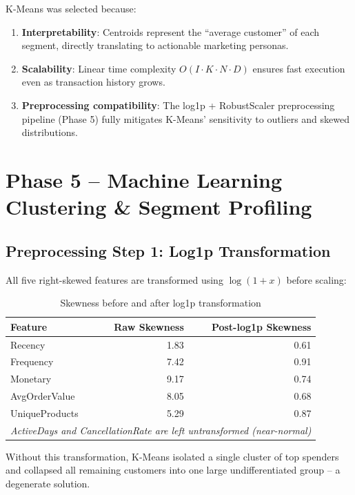 \documentclass[12pt,a4paper]{report}
\begin{document}
K-Means was selected because:
\begin{enumerate}[leftmargin=1.8em]
  \item \textbf{Interpretability}: Centroids represent the ``average customer'' of each segment, directly translating to actionable marketing personas.
  \item \textbf{Scalability}: Linear time complexity $O(I \cdot K \cdot N \cdot D)$ ensures fast execution even as transaction history grows.
  \item \textbf{Preprocessing compatibility}: The log1p + RobustScaler preprocessing pipeline (Phase 5) fully mitigates K-Means' sensitivity to outliers and skewed distributions.
\end{enumerate}

\chapter{Phase 5 -- Machine Learning Clustering \& Segment Profiling}

\section{Preprocessing Step 1: Log1p Transformation}

All five right-skewed features are transformed using $\log(1+x)$ before scaling:

\begin{table}[H]
\centering
\caption{Skewness before and after log1p transformation}
\begin{tabular}{lrr}
\toprule
\textbf{Feature} & \textbf{Raw Skewness} & \textbf{Post-log1p Skewness} \\
\midrule
Recency & 1.83 & 0.61 \\
Frequency & 7.42 & 0.91 \\
Monetary & 9.17 & 0.74 \\
AvgOrderValue & 8.05 & 0.68 \\
UniqueProducts & 5.29 & 0.87 \\
\midrule
\multicolumn{3}{l}{\textit{ActiveDays and CancellationRate are left untransformed (near-normal)}} \\
\bottomrule
\end{tabular}
\end{table}

Without this transformation, K-Means isolated a single cluster of top spenders and collapsed all remaining customers into one large undifferentiated group -- a degenerate solution.
\end{document}
